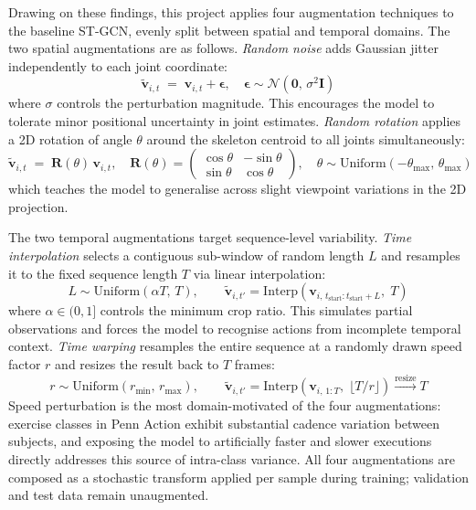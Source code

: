 Drawing on these findings, this project applies four augmentation techniques to the baseline ST-GCN, evenly split between spatial and temporal domains. The two spatial augmentations are as follows. \emph{Random noise} adds Gaussian jitter independently to each joint coordinate:
%
\begin{equation}
    \tilde{\mathbf{v}}_{i,t} \;=\; \mathbf{v}_{i,t} + \boldsymbol{\epsilon}, \quad \boldsymbol{\epsilon} \sim \mathcal{N}\!\left(\mathbf{0},\, \sigma^{2}\mathbf{I}\right)
    \label{eq:aug-noise}
\end{equation}
%
where $\sigma$ controls the perturbation magnitude. This encourages the model to tolerate minor positional uncertainty in joint estimates. \emph{Random rotation} applies a 2D rotation of angle $\theta$ around the skeleton centroid to all joints simultaneously:
%
\begin{equation}
    \tilde{\mathbf{v}}_{i,t} \;=\; \mathbf{R}(\theta)\,\mathbf{v}_{i,t}, \quad
    \mathbf{R}(\theta) = \begin{pmatrix} \cos\theta & -\sin\theta \\ \sin\theta & \cos\theta \end{pmatrix}, \quad
    \theta \sim \mathrm{Uniform}(-\theta_{\max},\, \theta_{\max})
    \label{eq:aug-rotation}
\end{equation}
%
which teaches the model to generalise across slight viewpoint variations in the 2D projection.

The two temporal augmentations target sequence-level variability. \emph{Time interpolation} selects a contiguous sub-window of random length $L$ and resamples it to the fixed sequence length $T$ via linear interpolation:
%
\begin{equation}
    L \sim \mathrm{Uniform}(\alpha T,\, T), \qquad
    \tilde{\mathbf{v}}_{i,t'} = \mathrm{Interp}\!\left(\mathbf{v}_{i,\,t_{\text{start}}:t_{\text{start}}+L},\; T\right)
    \label{eq:aug-crop}
\end{equation}
%
where $\alpha \in (0,1]$ controls the minimum crop ratio. This simulates partial observations and forces the model to recognise actions from incomplete temporal context. \emph{Time warping} resamples the entire sequence at a randomly drawn speed factor $r$ and resizes the result back to $T$ frames:
%
\begin{equation}
    r \sim \mathrm{Uniform}(r_{\min},\, r_{\max}), \qquad
    \tilde{\mathbf{v}}_{i,t'} = \mathrm{Interp}\!\left(\mathbf{v}_{i,\,1:T},\; \lfloor T/r \rfloor \right) \xrightarrow{\text{resize}} T
    \label{eq:aug-warp}
\end{equation}
%
Speed perturbation is the most domain-motivated of the four augmentations: exercise classes in Penn Action exhibit substantial cadence variation between subjects, and exposing the model to artificially faster and slower executions directly addresses this source of intra-class variance. All four augmentations are composed as a stochastic transform applied per sample during training; validation and test data remain unaugmented.

